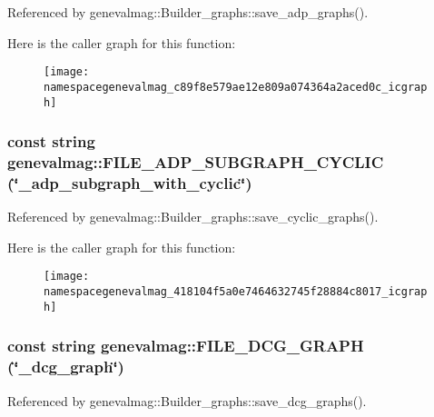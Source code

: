 Referenced by genevalmag::Builder\_\-graphs::save\_\-adp\_\-graphs().

Here is the caller graph for this function:\nopagebreak
\begin{figure}[H]
\begin{center}
\leavevmode
\texttt{[image: namespacegenevalmag\_c89f8e579ae12e809a074364a2aced0c\_icgraph]}
\end{center}
\end{figure}
\hypertarget{namespacegenevalmag_418104f5a0e7464632745f28884c8017}{
\subsubsection[{FILE\_\-ADP\_\-SUBGRAPH\_\-CYCLIC}]{\setlength{\rightskip}{0pt plus 5cm}const string genevalmag::FILE\_\-ADP\_\-SUBGRAPH\_\-CYCLIC (\char`\"{}\_\-adp\_\-subgraph\_\-with\_\-cyclic\char`\"{})}}
\label{namespacegenevalmag_418104f5a0e7464632745f28884c8017}




Referenced by genevalmag::Builder\_\-graphs::save\_\-cyclic\_\-graphs().

Here is the caller graph for this function:\nopagebreak
\begin{figure}[H]
\begin{center}
\leavevmode
\texttt{[image: namespacegenevalmag\_418104f5a0e7464632745f28884c8017\_icgraph]}
\end{center}
\end{figure}
\hypertarget{namespacegenevalmag_009f31ef1d07f4ca8786f9e2cc813279}{
\subsubsection[{FILE\_\-DCG\_\-GRAPH}]{\setlength{\rightskip}{0pt plus 5cm}const string genevalmag::FILE\_\-DCG\_\-GRAPH (\char`\"{}\_\-dcg\_\-graph\char`\"{})}}
\label{namespacegenevalmag_009f31ef1d07f4ca8786f9e2cc813279}




Referenced by genevalmag::Builder\_\-graphs::save\_\-dcg\_\-graphs().

